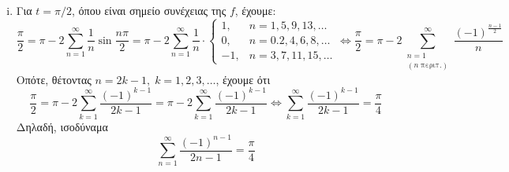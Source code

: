 \begin{solution}
\begin{enumerate}[i)]
    \item Για $ t= \pi /2 $, όπου είναι σημείο συνέχειας της $f$, έχουμε:
      \[
        \frac{\pi}{2} = \pi - 2 \sum_{n=1}^{\infty} \frac{1}{n} \sin{\frac{n \pi}{2}} =
        \pi - 2 \sum_{n=1}^{\infty} \frac{1}{n} \cdot 
        \begin{cases}
          1, & n=1,5,9,13,\ldots \\
          0, &n=0.2,4,6,8,\ldots \\
          -1, & n=3,7,11,15,\ldots 
        \end{cases} \Leftrightarrow  
        \frac{\pi}{2} = \pi - 2 \sum_{\substack{n=1 \\ (n \; \text{περιτ.})}}^{\infty}
        \frac{(-1)^{\frac{n-1}{2}}}{n} 
      \]
      Οπότε, θέτοντας $ n=2k-1, \; k=1,2,3,\ldots $, έχουμε ότι
      \[
        \frac{\pi}{2} = \pi - 2 \sum_{k=1}^{\infty} \frac{(-1)^{k-1}}{2k-1} = 
        \pi -2 \sum_{k=1}^{\infty} \frac{(-1)^{k-1}}{2k-1} \Leftrightarrow
        \sum_{k=1}^{\infty} \frac{(-1)^{k-1}}{2k-1} = \frac{\pi}{4}
      \]
      Δηλαδή, ισοδύναμα 
      \[
        \sum_{n=1}^{\infty} \frac{(-1)^{n-1}}{2n-1} = \frac{\pi}{4}  
      \]
  \end{enumerate}
\end{solution}

